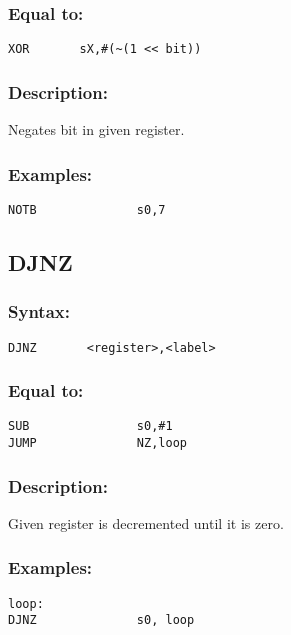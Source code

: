         \subsubsection{Equal to:}
        {
            \usecodefont
            \verb'XOR       sX,#(~(1 << bit))'
        }

        \subsubsection{Description:}
            Negates bit in given register.

        \subsubsection{Examples:}
        {
            \usecodefont
            \verb'NOTB              s0,7'\\
        }

    \subsection{DJNZ}
        \subsubsection{Syntax:}
        {
            \usecodefont
            \verb'DJNZ       <register>,<label>'
        }

        \subsubsection{Equal to:}
        {
            \usecodefont
            \verb'SUB               s0,#1'\\
            \verb'JUMP              NZ,loop'\\
        }

        \subsubsection{Description:}
            Given register is decremented until it is zero.

        \subsubsection{Examples:}
        {
            \usecodefont
            \verb'loop:             '\\
            \verb'DJNZ              s0, loop'\\
        }

